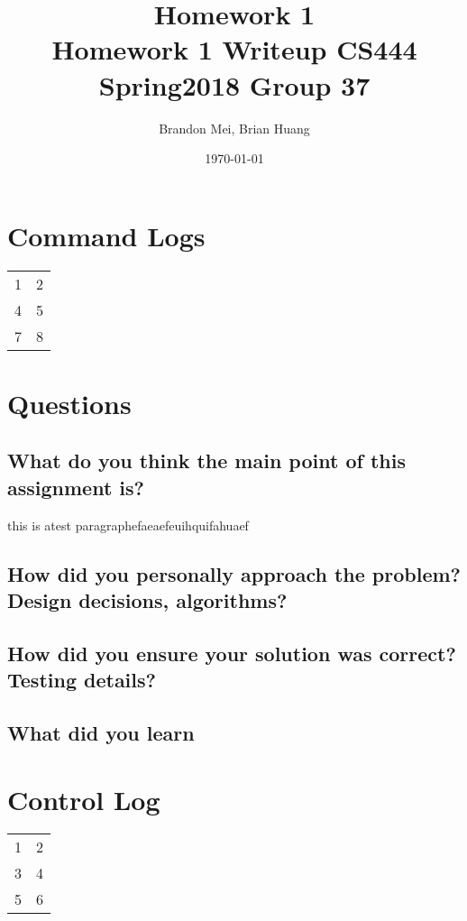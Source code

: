 \documentclass[onecolumn, 10pt, titlepage]{IEEEtran}
\title
{%
	Homework 1 \\
	\vspace{0.4cm}
	\large Homework 1 Writeup
	\vspace{0.4cm}
	\large CS444 Spring2018 Group 37
}
\author{Brandon Mei, Brian Huang}
\date{\today}
\begin{document}
\maketitle

\section*{Command Logs}
\begin{center}
	\begin{tabular}{ c c }
		1 & 2 \\
		4 & 5 \\
		7 & 8 
	\end{tabular}
\end{center}

\section*{Questions}
\subsection*{What do you think the main point of this assignment is?}
this is atest paragraphefaeaefeuihquifahuaef
\subsection*{How did you personally approach the problem? Design decisions, algorithms?}
\subsection*{How did you ensure your solution was correct? Testing details?}
\subsection*{What did you learn}

\section*{Control Log}
\begin{center}
	\begin{tabular}{ c c }
		1 & 2 \\
		3 & 4 \\
		5 & 6
	\end{tabular}
\end{center}
\end{document}
